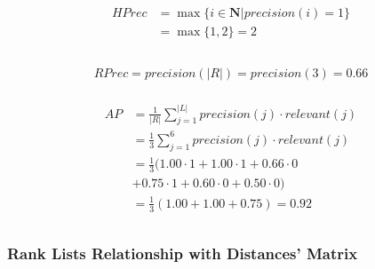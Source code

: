 \begin{example}
  \vspace{0.5cm}

  \begin{subexample}{\linewidth}
    \begin{gather*}
      \begin{split}
        HPrec &= \max\{i \in \mathbf{N} | precision(i) = 1\} \\
              &= \max\{1, 2\} = 2 \\
      \end{split}
    \end{gather*}
  \end{subexample}

  \vspace{0.5cm}

  \begin{subexample}{\linewidth}
    \begin{gather*}
      \begin{split}
        RPrec = precision(|R|) = precision(3) = 0.66
      \end{split}
    \end{gather*}
  \end{subexample}

  \vspace{0.5cm}

  \begin{subexample}{\linewidth}
    \begin{gather*}
      \begin{split}
        AP &= \frac{1}{|R|} \sum_{j=1}^{|L|} precision(j) \cdot relevant(j) \\
           &= \frac{1}{3} \sum_{j=1}^{6} precision(j) \cdot relevant(j) \\
           &= \frac{1}{3} ( 1.00 \cdot 1 + 1.00 \cdot 1 + 0.66 \cdot 0 \\
           &+ 0.75 \cdot 1 + 0.60 \cdot 0 + 0.50 \cdot 0) \\
           &= \frac{1}{3} (1.00 + 1.00 + 0.75) = 0.92 \\
      \end{split}
    \end{gather*}
  \end{subexample}

\end{example}

\subsubsection{Rank Lists Relationship with Distances' Matrix \label{sec:distances_matrix}}

